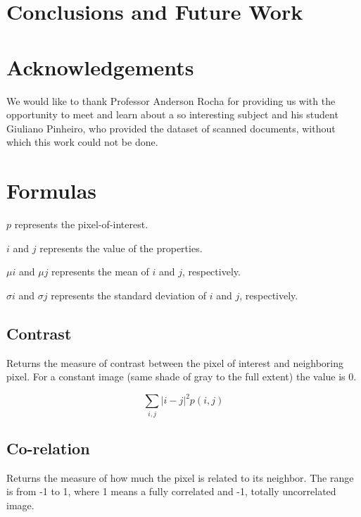 \documentclass[10pt,twocolumn,letterpaper]{article}
\begin{document}
\section{Conclusions and Future Work}
\label{sec:conclusions}

\section{Acknowledgements}
\label{sec:acknownledgements}

We would like to thank Professor Anderson Rocha for providing us with the opportunity to meet and learn about a so interesting subject and his student Giuliano Pinheiro, who provided the dataset of scanned documents, without which this work could not be done.

{\small


}

\newpage

\appendix
\label{app:Appendix A}

\section{Formulas}

$p$ represents the pixel-of-interest.

$i$ and $j$ represents the value of the properties.

$\mu i$ and $\mu j$ represents the mean of $i$ and $j$, respectively. 

$\sigma i$ and $\sigma j$ represents the standard deviation of $i$ and $j$, respectively.

\subsection{Contrast}

Returns the measure of contrast between the pixel of interest and neighboring pixel. For a constant image (same shade of gray to the full extent) the value is 0.

$$\sum_{i,j}\vert i - j \lvert^2 p(i,j)$$

\subsection{Co-relation}

Returns the measure of how much the pixel is related to its neighbor. The range is from -1 to 1, where 1 means a fully correlated and -1, totally uncorrelated image.
\end{document}
